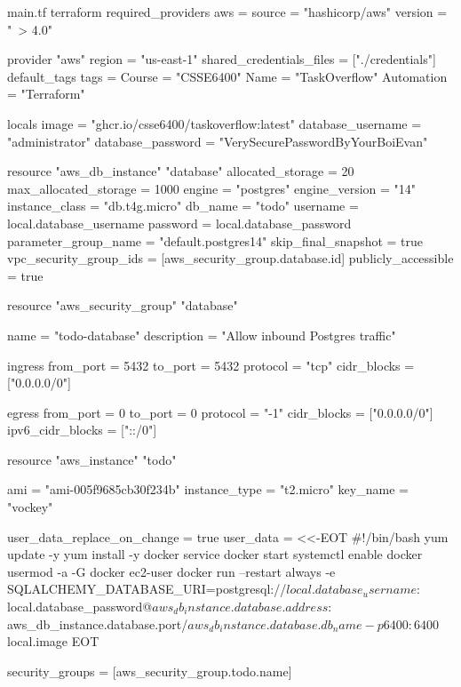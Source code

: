 \documentclass{csse4400}
\begin{document}
\begin{code}[language=terraform,numbers=none]{main.tf}
  terraform {
    required_providers {
        aws = {
            source  = "hashicorp/aws"
            version = "~> 4.0"
        }
    }
}

provider "aws" {
    region = "us-east-1"
    shared_credentials_files = ["./credentials"]
    default_tags {
        tags = {
            Course       = "CSSE6400"
            Name         = "TaskOverflow"
            Automation   = "Terraform"
        }
    }
}

locals {
    image = "ghcr.io/csse6400/taskoverflow:latest"
    database_username = "administrator"
    database_password = "VerySecurePasswordByYourBoiEvan"
}

resource "aws_db_instance" "database" {
  allocated_storage      = 20
  max_allocated_storage  = 1000
  engine                 = "postgres"
  engine_version         = "14"
  instance_class         = "db.t4g.micro"
  db_name                = "todo"
  username               = local.database_username
  password               = local.database_password
  parameter_group_name   = "default.postgres14"
  skip_final_snapshot    = true
  vpc_security_group_ids = [aws_security_group.database.id]
  publicly_accessible    = true
}

resource "aws_security_group" "database" {
  name        = "todo-database"
  description = "Allow inbound Postgres traffic"

  ingress {
    from_port        = 5432
    to_port          = 5432
    protocol         = "tcp"
    cidr_blocks      = ["0.0.0.0/0"]
  }

  egress {
    from_port        = 0
    to_port          = 0
    protocol         = "-1"
    cidr_blocks      = ["0.0.0.0/0"]
    ipv6_cidr_blocks = ["::/0"]
  }
}

resource "aws_instance" "todo" {
  ami           = "ami-005f9685cb30f234b"
  instance_type = "t2.micro"
  key_name      = "vockey"
  
  user_data_replace_on_change = true
  user_data                   = <<-EOT
#!/bin/bash
yum update -y
yum install -y docker
service docker start
systemctl enable docker
usermod -a -G docker ec2-user 
docker run --restart always -e SQLALCHEMY_DATABASE_URI=postgresql://${local.database_username}:${local.database_password}@${aws_db_instance.database.address}:${aws_db_instance.database.port}/${aws_db_instance.database.db_name} -p 6400:6400 ${local.image}
  EOT

  security_groups = [aws_security_group.todo.name]
}


\end{code}
\end{document}
